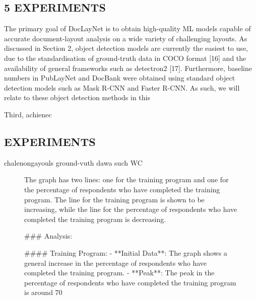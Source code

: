 \subsection{5 EXPERIMENTS}

The primary goal of DocLayNet is to obtain high-quality ML models capable of accurate document-layout analysis on a wide variety of challenging layouts. As discussed in Section 2, object detection models are currently the easiest to use, due to the standardisation of ground-truth data in COCO format [16] and the availability of general frameworks such as detectron2 [17]. Furthermore, baseline numbers in PubLayNet and DocBank were obtained using standard object detection models such as Mask R-CNN and Faster R-CNN. As such, we will relate to these object detection methods in this

\begin{figure}[h]
\end{figure}

Third, achienec

\subsection{EXPERIMENTS}

chalenongayouls ground-vuth dawa such WC

\begin{figure}[h]

The graph has two lines: one for the training program and one for the percentage of respondents who have completed the training program. The line for the training program is shown to be increasing, while the line for the percentage of respondents who have completed the training program is decreasing.

### Analysis:

#### Training Program:
- **Initial Data**: The graph shows a general increase in the percentage of respondents who have completed the training program.
- **Peak**: The peak in the percentage of respondents who have completed the training program is around 70%
\end{figure}

